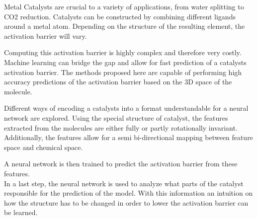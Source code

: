 
\Abstract

Metal Catalysts are crucial to a variety of applications, from water splitting to CO2 reduction. %
Catalysts can be constructed by combining different ligands around a metal atom.
Depending on the structure of the resulting element, the activation barrier will vary.

Computing this activation barrier is highly complex and therefore very costly. 
Machine learning can bridge the gap and allow for fast prediction of a catalysts activation barrier.
The methods proposed here are capable of performing high accuracy predictions of the activation barrier based on
the 3D space of the molecule.

Different ways of encoding a catalysts into a format understandable for a neural network are explored.
Using the special structure of catalyst, the features extracted from the molecules are either fully or partly rotationally invariant.
Additionally, the features allow for a semi bi-directional mapping between feature space and chemical space.

A neural network is then trained to predict the activation barrier from these features.
\\

In a last step, the neural network is used to analyze what parts of the catalyst responsible for the prediction of the model.
With this information an intuition on how the structure has to be changed in order to lower the activation barrier can be learned.
